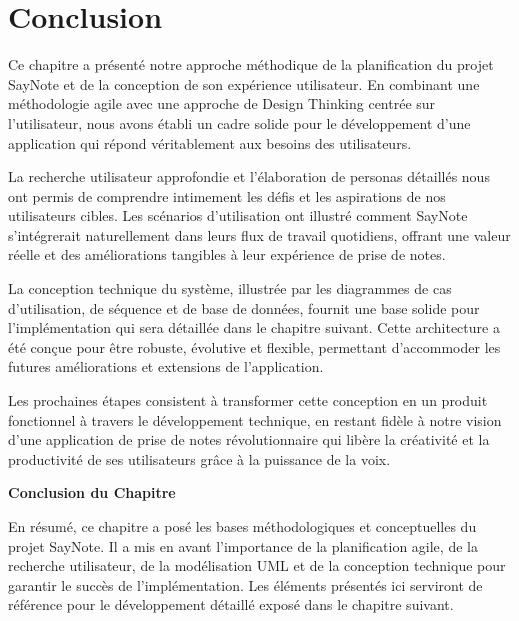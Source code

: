     \section{Conclusion}
    
    Ce chapitre a présenté notre approche méthodique de la planification du projet SayNote et de la conception de son expérience utilisateur. En combinant une méthodologie agile avec une approche de Design Thinking centrée sur l'utilisateur, nous avons établi un cadre solide pour le développement d'une application qui répond véritablement aux besoins des utilisateurs.
    
    La recherche utilisateur approfondie et l'élaboration de personas détaillés nous ont permis de comprendre intimement les défis et les aspirations de nos utilisateurs cibles. Les scénarios d'utilisation ont illustré comment SayNote s'intégrerait naturellement dans leurs flux de travail quotidiens, offrant une valeur réelle et des améliorations tangibles à leur expérience de prise de notes.
    
    La conception technique du système, illustrée par les diagrammes de cas d'utilisation, de séquence et de base de données, fournit une base solide pour l'implémentation qui sera détaillée dans le chapitre suivant. Cette architecture a été conçue pour être robuste, évolutive et flexible, permettant d'accommoder les futures améliorations et extensions de l'application.
    
    Les prochaines étapes consistent à transformer cette conception en un produit fonctionnel à travers le développement technique, en restant fidèle à notre vision d'une application de prise de notes révolutionnaire qui libère la créativité et la productivité de ses utilisateurs grâce à la puissance de la voix. 
    
    \vspace{1cm}
    \begin{center}
    \textbf{\large Conclusion du Chapitre}
    \end{center}
    
        En résumé, ce chapitre a posé les bases méthodologiques et conceptuelles du projet SayNote. Il a mis en avant l'importance de la planification agile, de la recherche utilisateur, de la modélisation UML et de la conception technique pour garantir le succès de l'implémentation. Les éléments présentés ici serviront de référence pour le développement détaillé exposé dans le chapitre suivant.